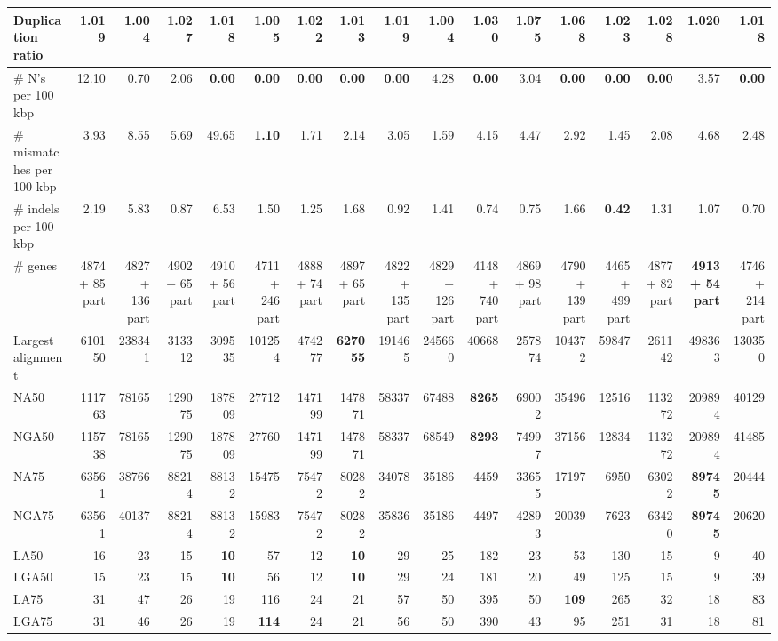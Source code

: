 \documentclass[12pt,a4paper]{article}
\begin{document}
\begin{table}[ht]
\begin{center}
\begin{tabular}{|l*{16}{|r}|}
Duplication ratio & 1.019 & {\bf 1.004} & 1.027 & 1.018 & 1.005 & 1.022 & 1.013 & 1.019 & {\bf 1.004} & 1.030 & 1.075 & 1.068 & 1.023 & 1.028 & 1.020 & 1.018 \\ \hline
\# N's per 100 kbp & 12.10 & 0.70 & 2.06 & {\bf 0.00} & {\bf 0.00} & {\bf 0.00} & {\bf 0.00} & {\bf 0.00} & 4.28 & {\bf 0.00} & 3.04 & {\bf 0.00} & {\bf 0.00} & {\bf 0.00} & 3.57 & {\bf 0.00} \\ \hline
\# mismatches per 100 kbp & 3.93 & 8.55 & 5.69 & 49.65 & {\bf 1.10} & 1.71 & 2.14 & 3.05 & 1.59 & 4.15 & 4.47 & 2.92 & 1.45 & 2.08 & 4.68 & 2.48 \\ \hline
\# indels per 100 kbp & 2.19 & 5.83 & 0.87 & 6.53 & 1.50 & 1.25 & 1.68 & 0.92 & 1.41 & 0.74 & 0.75 & 1.66 & {\bf 0.42} & 1.31 & 1.07 & 0.70 \\ \hline
\# genes & 4874 + 85 part & 4827 + 136 part & 4902 + 65 part & 4910 + 56 part & 4711 + 246 part & 4888 + 74 part & 4897 + 65 part & 4822 + 135 part & 4829 + 126 part & 4148 + 740 part & 4869 + 98 part & 4790 + 139 part & 4465 + 499 part & 4877 + 82 part & {\bf 4913 + 54 part} & 4746 + 214 part \\ \hline
Largest alignment & 610150 & 238341 & 313312 & 309535 & 101254 & 474277 & {\bf 627055} & 191465 & 245660 & 40668 & 257874 & 104372 & 59847 & 261142 & 498363 & 130350 \\ \hline
NA50 & 111763 & 78165 & 129075 & 187809 & 27712 & 147199 & 147871 & 58337 & 67488 & {\bf 8265} & 69002 & 35496 & 12516 & 113272 & 209894 & 40129 \\ \hline
NGA50 & 115738 & 78165 & 129075 & 187809 & 27760 & 147199 & 147871 & 58337 & 68549 & {\bf 8293} & 74997 & 37156 & 12834 & 113272 & 209894 & 41485 \\ \hline
NA75 & 63561 & 38766 & 88214 & 88132 & 15475 & 75472 & 80282 & 34078 & 35186 & 4459 & 33655 & 17197 & 6950 & 63022 & {\bf 89745} & 20444 \\ \hline
NGA75 & 63561 & 40137 & 88214 & 88132 & 15983 & 75472 & 80282 & 35836 & 35186 & 4497 & 42893 & 20039 & 7623 & 63420 & {\bf 89745} & 20620 \\ \hline
LA50 & 16 & 23 & 15 & {\bf 10} & 57 & 12 & {\bf 10} & 29 & 25 & 182 & 23 & 53 & 130 & 15 & 9 & 40 \\ \hline
LGA50 & 15 & 23 & 15 & {\bf 10} & 56 & 12 & {\bf 10} & 29 & 24 & 181 & 20 & 49 & 125 & 15 & 9 & 39 \\ \hline
LA75 & 31 & 47 & 26 & 19 & 116 & 24 & 21 & 57 & 50 & 395 & 50 & {\bf 109} & 265 & 32 & 18 & 83 \\ \hline
LGA75 & 31 & 46 & 26 & 19 & {\bf 114} & 24 & 21 & 56 & 50 & 390 & 43 & 95 & 251 & 31 & 18 & 81 \\ \hline
\end{tabular}
\end{center}
\end{table}
\end{document}
